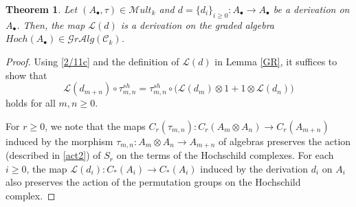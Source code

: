 \documentclass[10pt, colorlinks]{article}
\numberwithin{equation}{section} \DeclareMathSizes{2}{10}{12}{13}
\newtheorem{Thm}[thm]{Theorem}
\begin{document}
    \begin{Thm}\label{Thm2.10}
         Let $({A}_\bullet,\tau)\in \mathscr Mult_k$ and $d=\{d_i\}_{i\geq 0}:{A}_\bullet\longrightarrow {A}_\bullet$ be a derivation on ${A}_\bullet$. Then, the map $\mathscr{L}(d)$  is a derivation on the graded algebra $Hoch(A_\bullet)\in   \mathscr Gr\mathcal Alg(\mathcal C_k)$.
    \end{Thm}
    \begin{proof} Using \eqref{2/11c} and the definition of 
       $\mathscr{L}({d})$ in Lemma \ref{GR}, it suffices to show that
      \begin{equation*}
          \mathscr L(d_{m+n})\circ\tau^{sh}_{m,n}=\tau^{sh}_{m,n}\circ \big(\mathscr L({d}_{m})\otimes 1+1\otimes \mathscr L(d_n)\big)
      \end{equation*} 
      holds for all $m,n\geq 0$.
      
      \smallskip For  $r\geq 0$, we note that  the maps $C_r(\tau_{m,n}):C_r(A_m  \otimes A_n)\longrightarrow C_r(A_{m+n})$ induced by the morphism 
      $\tau_{m,n}:A_m\otimes A_n\longrightarrow A_{m+n}$ of algebras preserves the action (described in \eqref{act2}) of $S_r$ on the terms of the Hochschild complexes.  For each $i\geq 0$, the map $\mathscr{L}(d_i): C_*(A_i)\longrightarrow C_*(A_i)$ induced by the derivation $d_i$ on $A_i$ also preserves the action of the permutation groups on the Hochschild complex. 
      

\end{proof}
\end{document}
